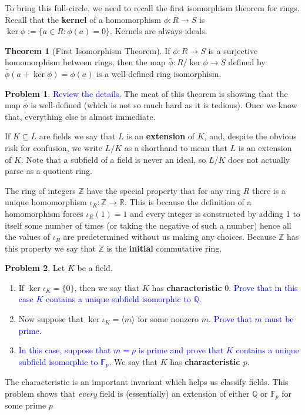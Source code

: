 \documentclass[11pt]{article}
\def\ZZ{\mathbb{Z}}
\def\QQ{\mathbb{Q}}
\def\FF{\mathbb{F}}
\def\RR{\mathbb{R}}
\theoremstyle{definition}
\newtheorem{theorem}{Theorem}[section]
\newtheorem{problem}{Problem}[section]
\numberwithin{equation}{subsection}
\newcommand{\blue}[1]{\textcolor{blue}{#1}}
\begin{document}
To bring this full-circle, we need to recall the first isomorphism theorem for rings.
Recall that the \textbf{kernel} of a homomorphism $\phi : R \to S$ is $\ker\phi := \{a \in R : \phi(a) = 0\}$.
Kernels are always ideals.

\begin{theorem}[First Isomorphism Theorem]
    If $\phi : R \to S$ is a surjective homomorphism between rings, then the map $\bar\phi : R/\ker\phi \to S$ defined by $\bar\phi(a + \ker\phi) = \phi(a)$ is a well-defined ring isomorphism.
\end{theorem}

\begin{problem}
    \blue{Review the details.}
    The meat of this theorem is showing that the map $\bar\phi$ is well-defined (which is not so much hard as it is tedious).
    Once we know that, everything else is almost immediate.
\end{problem}

If $K \subseteq L$ are fields we say that $L$ is an \textbf{extension} of $K$, and, despite the obvious risk for confusion, we write $L/K$ as a shorthand to mean that $L$ is an extension of $K$.
Note that a subfield of a field is never an ideal, so $L/K$ does not actually parse as a quotient ring.

The ring of integers $\ZZ$ have the special property that for any ring $R$ there is a unique homomorphism $\iota_R : \ZZ \to \RR$.
This is because the definition of a homomorphism forces $\iota_R(1) = 1$ and every integer is constructed by adding 1 to itself some number of times (or taking the negative of such a number) hence all the values of $\iota_R$ are predetermined without us making any choices.
Because $\ZZ$ has this property we say that $\ZZ$ is the \textbf{initial} commutative ring.

\begin{problem}
    Let $K$ be a field.
    \begin{enumerate}
        \item If $\ker\iota_K = \{0\}$, then we say that $K$ has \textbf{characteristic} 0.
        \blue{Prove that in this case $K$ contains a unique subfield isomorphic to $\QQ$.}

        \item Now suppose that $\ker\iota_K = \langle m \rangle$ for some nonzero $m$.
        \blue{Prove that $m$ must be prime.}

        \item \blue{In this case, suppose that $m = p$ is prime and prove that $K$ contains a unique subfield isomorphic to $\FF_p$.}
        We say that $K$ has \textbf{characteristic $p$}.
    \end{enumerate}
    The characteristic is an important invariant which helps us classify fields.
    This problem shows that \emph{every} field is (essentially) an extension of either $\QQ$ or $\FF_p$ for some prime $p$
\end{problem}
\end{document}
